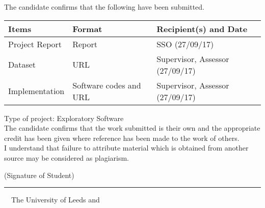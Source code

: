 \frontcover

\clearpage
\noindent The candidate confirms that the following have been submitted.\\

\begin{table}[ht!]
\begin{tabular}{|p{}|p{}|p{}|}
\hline 
Items & Format & Recipient(s) and Date \\ 
\hline 
Project Report & Report & SSO (27/09/17) \\ 
\hline 
Dataset & URL & Supervisor, Assessor (27/09/17) \\ 
\hline 
Implementation & Software codes and URL & Supervisor, Assessor (27/09/17) \\ 
\hline 
\end{tabular} 
\end{table}

\noindent Type of project: Exploratory Software
\vspace{\fill}\\
\noindent The candidate confirms that the work submitted is their own and the appropriate credit has been given where reference has been made to the work of others.
\vspace{\fill}\\
\noindent I understand that failure to attribute material which is obtained from another source may be considered as plagiarism.
\vspace{\fill}\\
\begin{flushright}
(Signature of Student) \rule{50mm}{1pt}
\end{flushright}
\vspace{\fill}
\textcopyright~\session~The University of Leeds and~\fullname

\begin{dissertationsummary}

\end{dissertationsummary}


\tableofcontents

\clearpage
\listoftables
